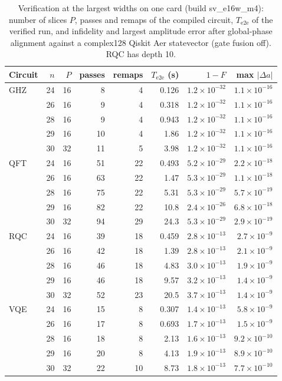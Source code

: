 \documentclass[pdflatex,sn-mathphys-num]{sn-jnl}
\theoremstyle{thmstyleone}
\theoremstyle{thmstylethree}
\begin{document}
\begin{table}
\centering
\caption{Verification at the largest widths on one card (build sv\_e16w\_m4): number of slices $P$, passes and remaps of the compiled circuit, $T_\mathrm{e2e}$ of the verified run, and infidelity and largest amplitude error after global-phase alignment against a complex128 Qiskit Aer statevector (gate fusion off). RQC has depth 10.}\label{tab:maxwidth}
\small
\begin{tabular}{lrrrrrrr}
\toprule
Circuit & $n$ & $P$ & passes & remaps & $T_\mathrm{e2e}$ (s) & $1-F$ & max $|\Delta a|$ \\
\midrule
GHZ & 24 & 16 & 8 & 4 & 0.126 & $1.2\times 10^{-32}$ & $1.1\times 10^{-16}$ \\
 & 26 & 16 & 9 & 4 & 0.318 & $1.2\times 10^{-32}$ & $1.1\times 10^{-16}$ \\
 & 28 & 16 & 9 & 4 & 0.943 & $1.2\times 10^{-32}$ & $1.1\times 10^{-16}$ \\
 & 29 & 16 & 10 & 4 & 1.86 & $1.2\times 10^{-32}$ & $1.1\times 10^{-16}$ \\
 & 30 & 32 & 11 & 5 & 3.98 & $1.2\times 10^{-32}$ & $1.1\times 10^{-16}$ \\
\addlinespace
QFT & 24 & 16 & 51 & 22 & 0.493 & $5.2\times 10^{-29}$ & $2.2\times 10^{-18}$ \\
 & 26 & 16 & 63 & 22 & 1.47 & $5.3\times 10^{-29}$ & $1.1\times 10^{-18}$ \\
 & 28 & 16 & 75 & 22 & 5.31 & $5.3\times 10^{-29}$ & $5.7\times 10^{-19}$ \\
 & 29 & 16 & 82 & 22 & 10.8 & $2.4\times 10^{-26}$ & $6.8\times 10^{-18}$ \\
 & 30 & 32 & 94 & 29 & 24.3 & $5.3\times 10^{-29}$ & $2.9\times 10^{-19}$ \\
\addlinespace
RQC & 24 & 16 & 39 & 18 & 0.459 & $2.8\times 10^{-13}$ & $2.7\times 10^{-9}$ \\
 & 26 & 16 & 42 & 18 & 1.39 & $2.8\times 10^{-13}$ & $2.1\times 10^{-9}$ \\
 & 28 & 16 & 46 & 18 & 4.83 & $3.0\times 10^{-13}$ & $1.9\times 10^{-9}$ \\
 & 29 & 16 & 46 & 18 & 9.57 & $3.2\times 10^{-13}$ & $1.4\times 10^{-9}$ \\
 & 30 & 32 & 52 & 23 & 20.5 & $3.7\times 10^{-13}$ & $1.4\times 10^{-9}$ \\
\addlinespace
VQE & 24 & 16 & 15 & 8 & 0.307 & $1.4\times 10^{-13}$ & $5.8\times 10^{-9}$ \\
 & 26 & 16 & 17 & 8 & 0.693 & $1.7\times 10^{-13}$ & $1.5\times 10^{-9}$ \\
 & 28 & 16 & 18 & 8 & 2.13 & $1.6\times 10^{-13}$ & $9.2\times 10^{-10}$ \\
 & 29 & 16 & 20 & 8 & 4.13 & $1.9\times 10^{-13}$ & $8.9\times 10^{-10}$ \\
 & 30 & 32 & 22 & 10 & 8.73 & $1.8\times 10^{-13}$ & $7.7\times 10^{-10}$ \\
\bottomrule
\end{tabular}
\end{table}
\end{document}
